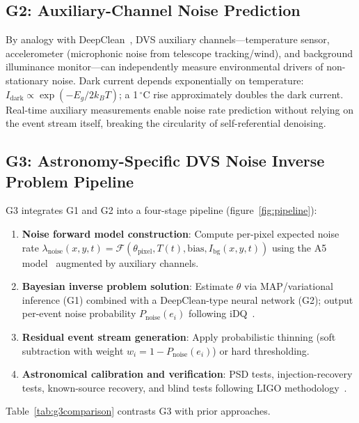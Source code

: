 \documentclass[12pt]{article}
\begin{document}
\subsection{G2: Auxiliary-Channel Noise Prediction}

By analogy with DeepClean~\cite{D1}, DVS auxiliary channels---temperature sensor, accelerometer (microphonic noise from telescope tracking/wind), and background illuminance monitor---can independently measure environmental drivers of non-stationary noise.
Dark current depends exponentially on temperature: $I_\mathrm{dark} \propto \exp(-E_g / 2k_BT)$; a 1\,$^\circ$C rise approximately doubles the dark current.
Real-time auxiliary measurements enable noise rate prediction without relying on the event stream itself, breaking the circularity of self-referential denoising.

\subsection{G3: Astronomy-Specific DVS Noise Inverse Problem Pipeline}

G3 integrates G1 and G2 into a four-stage pipeline (figure~\ref{fig:pipeline}):
\begin{enumerate}
  \item \textbf{Noise forward model construction}: Compute per-pixel expected noise rate $\lambda_\mathrm{noise}(x,y,t) = \mathcal{F}(\theta_\mathrm{pixel}, T(t), \mathrm{bias}, I_\mathrm{bg}(x,y,t))$ using the A5 model~\cite{A5} augmented by auxiliary channels.
  \item \textbf{Bayesian inverse problem solution}: Estimate $\theta$ via MAP/variational inference (G1) combined with a DeepClean-type neural network (G2); output per-event noise probability $P_\mathrm{noise}(e_i)$ following iDQ~\cite{D6}.
  \item \textbf{Residual event stream generation}: Apply probabilistic thinning (soft subtraction with weight $w_i = 1 - P_\mathrm{noise}(e_i)$) or hard thresholding.
  \item \textbf{Astronomical calibration and verification}: PSD tests, injection-recovery tests, known-source recovery, and blind tests following LIGO methodology~\cite{D1}.
\end{enumerate}

Table~\ref{tab:g3comparison} contrasts G3 with prior approaches.
\end{document}
